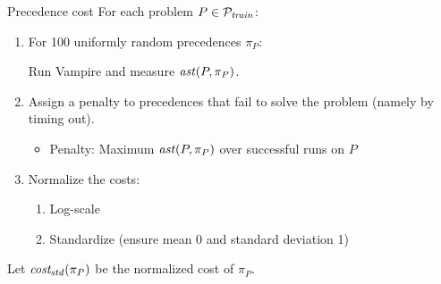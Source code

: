 \documentclass[notes]{beamer}
\begin{document}
\begin{frame}{Precedence cost}
For each problem $P \in \mathcal{P}_{\mathit{train}}$:
\begin{enumerate}
	\item For 100 uniformly random precedences $\pi_P$:

	Run Vampire and measure $\operatorname{\mathit{ast}}(P,\pi_P)$.
	\item Assign a penalty to precedences that fail to solve the problem (namely by timing out).
	\begin{itemize}
		\item Penalty: Maximum $\operatorname{\mathit{ast}}(P,\pi_P)$ over successful runs on $P$
	\end{itemize}
	\item Normalize the costs:
	\begin{enumerate}
		\item Log-scale
		\item Standardize (ensure mean 0 and standard deviation 1)
	\end{enumerate}
\end{enumerate}
Let $\operatorname{\mathit{cost_{std}}}(\pi_P)$ be the normalized cost of $\pi_P$.
\end{frame}
\end{document}
